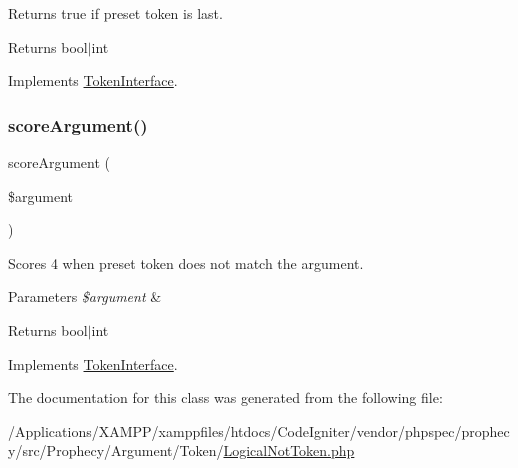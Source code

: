 Returns true if preset token is last.

\begin{DoxyReturn}{Returns}
bool$\vert$int 
\end{DoxyReturn}


Implements \mbox{\hyperlink{interface_prophecy_1_1_argument_1_1_token_1_1_token_interface_ac72b8349b1340887fc1af30eca2b951c}{Token\+Interface}}.

\mbox{\label{class_prophecy_1_1_argument_1_1_token_1_1_logical_not_token_a8d5bf47ab6eaa935458d5ad160e52822}} 
\subsubsection{\texorpdfstring{score\+Argument()}{scoreArgument()}}
{\footnotesize\ttfamily score\+Argument (\begin{DoxyParamCaption}\item[{}]{\$argument }\end{DoxyParamCaption})}

Scores 4 when preset token does not match the argument.


\begin{DoxyParams}{Parameters}
{\em \$argument} & \\
\hline
\end{DoxyParams}
\begin{DoxyReturn}{Returns}
bool$\vert$int 
\end{DoxyReturn}


Implements \mbox{\hyperlink{interface_prophecy_1_1_argument_1_1_token_1_1_token_interface_a8d5bf47ab6eaa935458d5ad160e52822}{Token\+Interface}}.



The documentation for this class was generated from the following file\+:\begin{DoxyCompactItemize}
\item 
/\+Applications/\+X\+A\+M\+P\+P/xamppfiles/htdocs/\+Code\+Igniter/vendor/phpspec/prophecy/src/\+Prophecy/\+Argument/\+Token/\mbox{\hyperlink{_logical_not_token_8php}{Logical\+Not\+Token.\+php}}\end{DoxyCompactItemize}
